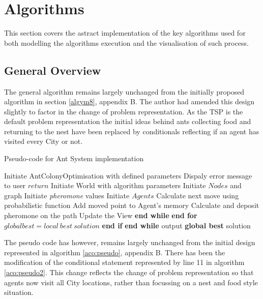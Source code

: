 \section{Algorithms}

This section covers the astract implementation of the key algorithms used for both modelling the algorithms execution and the visualisation of such process.

\subsection{General Overview}

The general algorithm remains largely unchanged from the initially proposed algorithm in section \ref{algym8}, appendix B. The author had amended this design slightly to factor in the change of problem representation. As the TSP is the default problem representation the initial ideas behind ants collecting food and returning to the nest have been replaced by conditionals reflecting if an agent has visited every City or not.

\begin{algorithm}
\caption{Pseudo-code for Ant System implementation}
\label{aco:pseudo2}
\begin{algorithmic}[1]
\State Initiate AntColonyOptimisation with defined parameters
\State Dispaly error message to user
\State $return$
\EndIf
\State Initiate World with algorithm parameters
\State Initiate $Nodes$ and graph
\State Initiate \textit{pheromone} values
\State Initiate $Agents$
\State Calculate next move using probabilistic function 
\State Add moved point to Agent's memory
\State Calculate and deposit pheromone on the path
\State Update the View
\EndWhile 
\State \textbf{end while}
\EndFor 
\State \textbf{end for}
\EndWhile
{}
\State $global best = local\ best\ solution$
\EndIf
\State \textbf{end if}
\State \textbf{end while}
\State output \textbf{global best} solution
\end{algorithmic}
\end{algorithm}

The pseudo code has however, remains largely unchanged from the initial design represented in algorithm \ref{aco:pseudo}, appendix B. There has been the modification of the conditional statement represented by line 11 in algorithm \ref{aco:pseudo2}. This change reflects the change of problem representation so that agents now visit all City locations, rather than focussing on a nest and food style situation.

